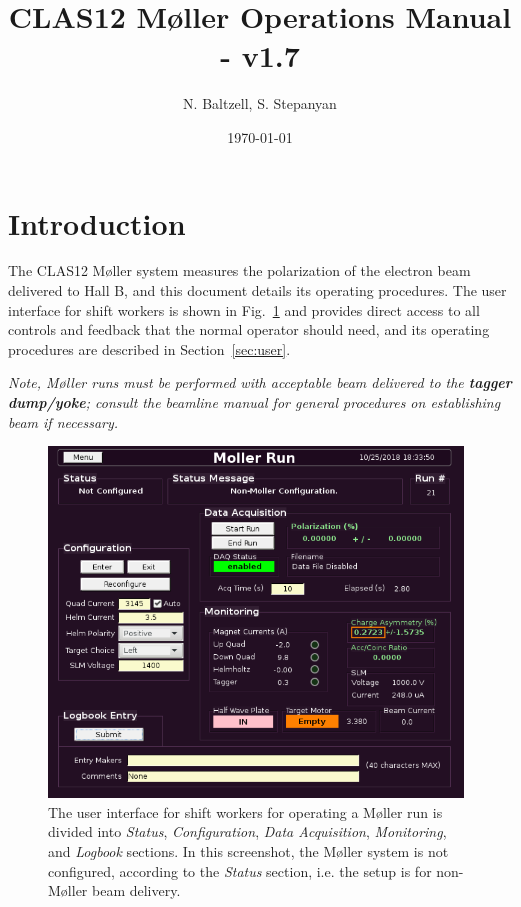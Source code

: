 \documentclass[amsmath,amssymb,notitlepage,12pt]{revtex4}
\begin{document}
\title{CLAS12 M{\o}ller Operations Manual - v1.7}
\date{\today}
\author{N. Baltzell, S. Stepanyan}
\begin{abstract}
\end{abstract}

\maketitle

\section{Introduction}
The CLAS12 M{\o}ller system measures the polarization of the electron beam delivered to Hall B, and this document details its operating procedures.  The user interface for shift workers is shown in Fig.~\ref{fig:unconfig} and provides direct access to all controls and feedback that the normal operator should need, and its operating procedures are described in Section~\ref{sec:user}.

{\em \large Note, M{\o}ller runs must be performed with acceptable beam delivered to the {\bf tagger dump/yoke};  consult the beamline manual for general procedures on establishing beam if necessary.}

\begin{figure}[htbp]\centering
    \includegraphics[width=11cm]{pics/unconfig}
    \caption{The user interface for shift workers for operating a M{\o}ller run is divided into {\em Status}, {\em Configuration}, {\em Data Acquisition}, {\em Monitoring}, and {\em Logbook} sections.  In this screenshot, the M{\o}ller system is not configured, according to the {\em Status} section, i.e. the setup is for non-M{\o}ller beam delivery.\label{fig:unconfig}}
\end{figure}
\end{document}
